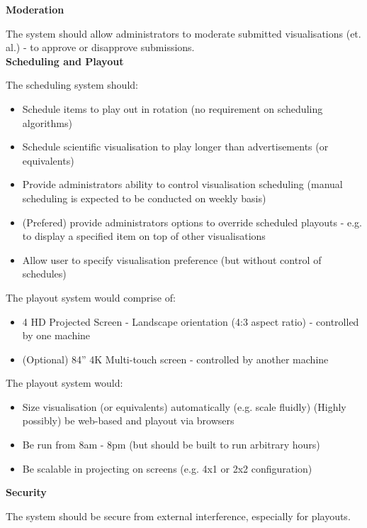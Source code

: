 ﻿\documentclass[a4paper, titlepage]{article}
\begin{document}
\textbf{\large Moderation}

The system should allow administrators to moderate submitted visualisations (et. al.) - to approve or disapprove submissions.\\

\textbf{\large Scheduling and Playout}

The scheduling system should:

\begin{itemize}
\item Schedule items to play out in rotation (no requirement on scheduling algorithms)
\item Schedule scientific visualisation to play longer than advertisements (or equivalents)
\item Provide administrators ability to control visualisation scheduling (manual scheduling is expected to be conducted on weekly basis)
\item (Prefered) provide administrators options to override scheduled playouts - e.g. to display a specified item on top of other visualisations
\item Allow user to specify visualisation preference (but without control of schedules)
\end{itemize}

The playout system would comprise of:

\begin{itemize}
\item 4 HD Projected Screen - Landscape orientation (4:3 aspect ratio) - controlled by one machine 
\item (Optional) 84” 4K Multi-touch screen - controlled by another machine
\end{itemize}

The playout system would:

\begin{itemize}
\item Size visualisation (or equivalents) automatically (e.g. scale fluidly) (Highly possibly) be web-based and playout via browsers
\item Be run from 8am - 8pm (but should be built to run arbitrary hours)
\item Be scalable in projecting on screens (e.g. 4x1 or 2x2 configuration)\\
\end{itemize}

\textbf{\large Security}

The system should be secure from external interference, especially for playouts.\\
\end{document}
